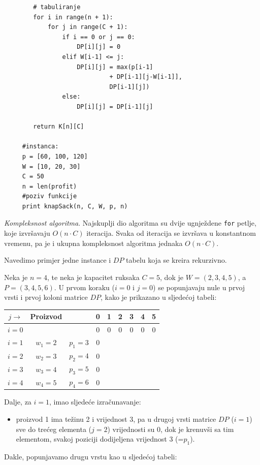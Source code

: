 \begin{solution}
\begin{verbatim}
	 	# tabuliranje
	 	for i in range(n + 1):
	 		for j in range(C + 1):
	 			if i == 0 or j == 0:
	 				DP[i][j] = 0
	 			elif W[i-1] <= j:
	 				DP[i][j] = max(p[i-1]
	 				         + DP[i-1][j-W[i-1]],
	 				         DP[i-1][j])
	 			else:
	 				DP[i][j] = DP[i-1][j]
	 
	 	return K[n][C]
	 
	 #instanca:
	 p = [60, 100, 120]
	 W = [10, 20, 30]
	 C = 50
	 n = len(profit)
	 #poziv funkcije
	 print knapSack(n, C, W, p, n)
	 \end{verbatim}
	 
 \textit{Kompleksnost algoritma}. Najskuplji dio algoritma su dvije ugnježdene \texttt{for} petlje, koje izvršavaju $O(n \cdot C)$ iteracija. Svaka od iteracija se izvršava u konstantnom vremenu, pa je i ukupna kompleksnost algoritma jednaka $O(n \cdot C)$.
\end{solution}

Navedimo primjer jedne instance i $DP$ tabelu koja se kreira rekurzivno. 

Neka je $n = 4$, te neka je kapacitet ruksaka $C= 5$, dok je  $W = (2, 3, 4, 5)$, a $P = (3, 4, 5, 6)$. 
 U prvom koraku ($i=0$ i $j =0$) se popunjavaju nule u prvoj vrsti i prvoj koloni matrice $DP$, kako je prikazano u sljedećoj tabeli:
  \begin{table}[H]
 	\centering
 	\begin{tabular}{|c|cc|cccccc|}\hline
 
  	$j\rightarrow$     & Proizvod   &              &	 	0	&1&	2	&3	&4	&5 \\ \hline
        
 $i=0$ & 	& 	    & 	        0	&0	&0	&0	&0	&0  \\
 $i=1$ &	$w_1=2$	&$p_1=3$ &	0	& 	& 	& 	& 	&\\ 
 $i=2$ &	$w_2=3$	&$p_2=4$ &	0   &	& 	& 	&	&\\	 
 $i=3$ &	$w_3=4$	&$p_3=5$ &	0	& 	& 	& 	& 	&\\ 
 $i=4$ &	$w_4=5$ &$p_4=6$ &	0	& 	& 	& 	& 	&\\ \hline
 \end{tabular}
\end{table}
 
 Dalje, za $i = 1$, imao sljedeće izračunavanje: 
 \begin{itemize}
 	\item proizvod 1 ima težinu 2 i vrijednost 3, pa u drugoj vrsti matrice $DP$ ($i=1$) sve do trećeg elementa ($j=2$) vrijednosti su 0, dok je krenuvši sa tim elementom, svakoj poziciji dodijeljena vrijednost 3 (=$p_1$). 
 \end{itemize}
Dakle, popunjavamo drugu vrstu kao u sljedećoj tabeli:
 
